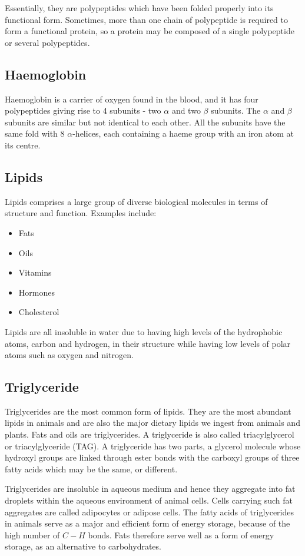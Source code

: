 \documentclass[11pt]{article}
\begin{document}
Essentially, they are polypeptides which have been folded properly into its functional form. Sometimes, more than one chain of polypeptide is required to form a functional protein, so a protein may be composed of a single polypeptide or several polypeptides.
\subsection{Haemoglobin}
\label{sec:org1fbcad8}
Haemoglobin is a carrier of oxygen found in the blood, and it has four polypeptides giving rise to 4 subunits - two \(\alpha\) and two \(\beta\) subunits. The \(\alpha\) and \(\beta\) subunits are similar but not identical to each other. All the subunits have the same fold with 8 \(\alpha\)-helices, each containing a haeme group with an iron atom at its centre.

\newpage
\subsection{Lipids}
\label{sec:org558463b}
Lipids comprises a large group of diverse biological molecules in terms of structure and function. Examples include:
\begin{itemize}
\item Fats
\item Oils
\item Vitamins
\item Hormones
\item Cholesterol
\end{itemize}

Lipids are all insoluble in water due to having high levels of the hydrophobic atoms, carbon and hydrogen, in their structure while having low levels of polar atoms such as oxygen and nitrogen.
\subsection{Triglyceride}
\label{sec:org23ee649}
Triglycerides are the most common form of lipids. They are the most abundant lipids in animals and are also the major dietary lipids we ingest from animals and plants. Fats and oils are triglycerides. A triglyceride is also called triacylglycerol or triacylglyceride (TAG). A triglyceride has two parts, a glycerol molecule whose hydroxyl groups are linked through ester bonds with the carboxyl groups of three fatty acids which may be the same, or different.


Triglycerides are insoluble in aqueous medium and hence they aggregate into fat droplets within the aqueous environment of animal cells. Cells carrying such fat aggregates are called adipocytes or adipose cells. The fatty acids of triglycerides in animals serve as a major and efficient form of energy storage, because of the high number of \(C - H\) bonds. Fats therefore serve well as a form of energy storage, as an alternative to carbohydrates.
\end{document}
